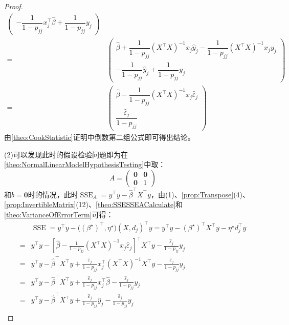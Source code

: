 \begin{proof}
\begin{align*}
\begin{pmatrix}
		-\dfrac{1}{1-p_{jj}}x_j^{\top}\hat{\beta}+\dfrac{1}{1-p_{jj}}y_j
	\end{pmatrix} \\
	=&
	\begin{pmatrix}
		\hat{\beta}+\dfrac{1}{1-p_{jj}}(X^{\top}X)^{-1}x_j\hat{y}_j-\dfrac{1}{1-p_{jj}}(X^{\top}X)^{-1}x_jy_j \\
		-\dfrac{1}{1-p_{jj}}\hat{y}_j+\dfrac{1}{1-p_{jj}}y_j
	\end{pmatrix} \\
	=&
	\begin{pmatrix}
		\hat{\beta}-\dfrac{1}{1-p_{jj}}(X^{\top}X)^{-1}x_j\hat{\varepsilon}_j \\
		\dfrac{\hat{\varepsilon}_j}{1-p_{jj}}
	\end{pmatrix}
	\end{align*}
	由\cref{theo:CookStatistic}证明中倒数第二组公式即可得出结论。\par
	(2)可以发现此时的假设检验问题即为在\cref{theo:NormalLinearModelHypothesisTesting}中取：
	\begin{equation*}
		A=
		\begin{pmatrix}
			\mathbf{0} & \mathbf{0} \\
			\mathbf{0} & 1
		\end{pmatrix}
	\end{equation*}
	和$b=\mathbf{0}$时的情况，此时$\operatorname{SSE}_A=y^{\top}y-\hat{\beta}^{\top}X^{\top}y$，由(1)、\cref{prop:Transpose}(4)、\cref{prop:InvertibleMatrix}(12)、\cref{theo:SSESSEACalculate}和\cref{theo:VarianceOfErrorTerm}可得：
	\begin{align*}
		&\operatorname{SSE}=y^{\top}y-\Big((\beta^{\star})^{\top},\eta^{\star}\Big)(X,d_j)^{\top}y=y^{\top}y-(\beta^{\star})^{\top}X^{\top}y-\eta^{\star}d_j^{\top}y \\
		=&y^{\top}y-\left[\hat{\beta}-\frac{1}{1-p_{jj}}(X^{\top}X)^{-1}x_j\hat{\varepsilon}_j\right]^{\top}X^{\top}y-\frac{\hat{\varepsilon}_j}{1-p_{jj}}y_j \\
		=&y^{\top}y-\hat{\beta}^{\top}X^{\top}y+\frac{\hat{\varepsilon}_j}{1-p_{jj}}x_j^{\top}(X^{\top}X)^{-1}X^{\top}y-\frac{\hat{\varepsilon}_j}{1-p_{jj}}y_j \\
		=&y^{\top}y-\hat{\beta}^{\top}X^{\top}y+\frac{\hat{\varepsilon}_j}{1-p_{jj}}x_j^{\top}\hat{\beta}-\frac{\hat{\varepsilon}_j}{1-p_{jj}}y_j \\
		=&y^{\top}y-\hat{\beta}^{\top}X^{\top}y+\frac{\hat{\varepsilon}_j}{1-p_{jj}}\hat{y}_j-\frac{\hat{\varepsilon}_j}{1-p_{jj}}y_j \\

\end{align*}
\end{proof}
